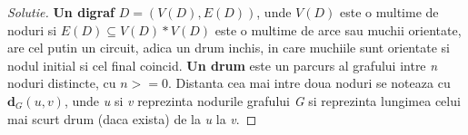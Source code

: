 \documentclass[12pt]{article}
\begin{document}
\begin{proof}[Solutie]
\textbf{Un digraf} \(D = (V(D), E(D))\), unde \(V(D)\) este o multime de noduri si \(E(D) \subseteq V(D) * V(D)\) este o multime de arce sau muchii orientate, are cel putin un circuit, adica un drum inchis, in care muchiile sunt orientate si nodul initial si cel final coincid. \textbf{Un drum} este un parcurs al grafului intre \textit{n} noduri distincte, cu \(n>=0\). Distanta cea mai intre doua noduri se noteaza cu \(\mathbf{d}_{G}(u, v)\), unde \textit{u} si \textit{v} reprezinta nodurile grafului \textit{G} si reprezinta lungimea celui mai scurt drum (daca exista) de la \textit{u} la \textit{v}.

\end{proof}
\end{document}
